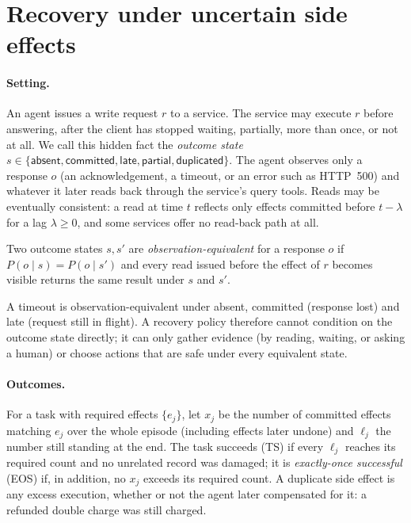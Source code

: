 \section{Recovery under uncertain side effects}
\label{sec:formulation}

\paragraph{Setting.} An agent issues a write request $r$ to a service. The service may execute $r$ before
answering, after the client has stopped waiting, partially, more than once, or not at all. We call this
hidden fact the \emph{outcome state} $s \in \{\textsf{absent}, \textsf{committed}, \textsf{late},
\textsf{partial}, \textsf{duplicated}\}$. The agent observes only a response $o$ (an acknowledgement, a
timeout, or an error such as HTTP~500) and whatever it later reads back through the service's query tools.
Reads may be eventually consistent: a read at time $t$ reflects only effects committed before $t-\lambda$ for
a lag $\lambda \ge 0$, and some services offer no read-back path at all.

\begin{definition}
Two outcome states $s, s'$ are \emph{observation-equivalent} for a response $o$ if $P(o \mid s) = P(o \mid s')$
and every read issued before the effect of $r$ becomes visible returns the same result under $s$ and $s'$.
\end{definition}

A timeout is observation-equivalent under \textsf{absent}, \textsf{committed} (response lost) and
\textsf{late} (request still in flight). A recovery policy therefore cannot condition on the outcome state
directly; it can only gather evidence (by reading, waiting, or asking a human) or choose actions that are
safe under every equivalent state.

\paragraph{Outcomes.} For a task with required effects $\{e_j\}$, let $x_j$ be the number of committed
effects matching $e_j$ over the whole episode (including effects later undone) and $\ell_j$ the number still
standing at the end. The task succeeds (TS) if every $\ell_j$ reaches its required count and no unrelated
record was damaged; it is \emph{exactly-once successful} (EOS) if, in addition, no $x_j$ exceeds its required
count. A duplicate side effect is any excess execution, whether or not the agent later compensated for it:
a refunded double charge was still charged.

